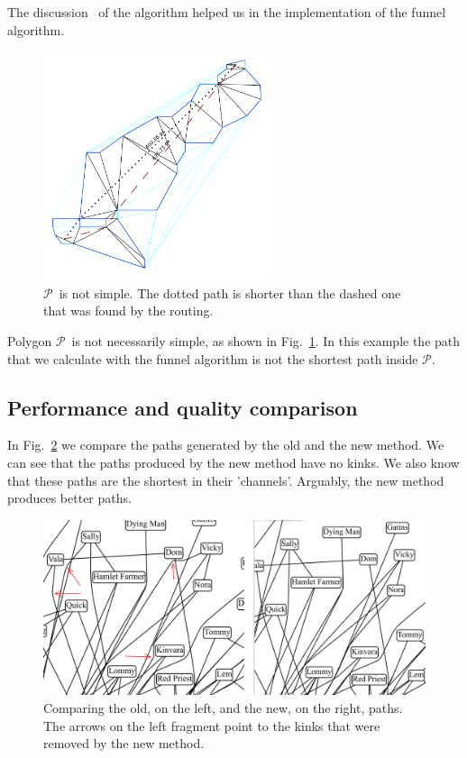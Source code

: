 \documentclass{llncs}
\newcommand{\plg}{$\mathcal{P}$}
\begin{document}
{The discussion~\cite{pathOpt} of the algorithm helped us in the implementation of the funnel algorithm.\\
\begin{figure}[]
  \centering
  \includegraphics*[width=0.6\textwidth]{sleeve_diagonals_not_optimal.pdf}
  \caption{\plg~is not simple. The dotted path is shorter than the dashed one that was found by the routing.}
  \label{fig:non_optimal_path}
\end{figure}
Polygon \plg~is not necessarily simple, as shown in Fig.~\ref{fig:non_optimal_path}.
In this example the path that we calculate with the funnel algorithm is not the shortest path inside \plg.
\subsection{Performance and quality comparison}
In Fig.~\ref{fig:improved_routing} we compare the paths generated by the old and the new method. We can see that the paths produced by the new method have no kinks. We also know that these paths are  the shortest in their 'channels'. Arguably, the new method produces better paths.
\begin{figure}[]
  \centering
  \includegraphics*[width=1\textwidth]{comparison.png}
  \caption{Comparing the old, on the left, and the new, on the right, paths. The arrows on the left fragment point to the kinks that were removed by the new method.}
  \label{fig:improved_routing}
\end{figure}


}
\end{document}
